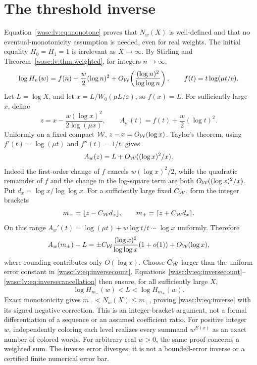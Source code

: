 \documentclass[11pt,a4paper]{article}
\theoremstyle{remark}\newtheorem{remark}[theorem]{Remark}
\numberwithin{equation}{section}
\begin{document}
\section{The threshold inverse}\label{wasc:lv:sec:inverse}
Equation~\eqref{wasc:lv:eq:monotone} proves that $N_w(X)$ is well-defined and that no eventual-monotonicity assumption is needed, even for real weights. The initial equality $H_0=H_1=1$ is irrelevant as $X\to\infty$.
By Stirling and Theorem~\ref{wasc:lv:thm:weighted}, for integers $n\to\infty$,
\begin{equation}\label{wasc:lv:eq:inversecount}
\log H_n(w)=f(n)+\frac w2(\log n)^2+
O_{\mathcal W}\!\left(\frac{(\log n)^2}{\log\log n}\right),\qquad
f(t)=t\log(\mu t/\mathrm e).
\end{equation}
Let $L=\log X$, and let $x=L/W_0(\mu L/\ee)$, so $f(x)=L$.
For sufficiently large $x$, define
\[
z=x-\frac{w(\log x)^2}{2\log(\mu x)},\qquad
A_w(t)=f(t)+\frac w2(\log t)^2.
\]
Uniformly on a fixed compact $\mathcal W$, $z-x=O_{\mathcal W}(\log x)$.
Taylor's theorem, using $f'(t)=\log(\mu t)$ and $f''(t)=1/t$, gives
\begin{equation}\label{wasc:lv:eq:inversecancellation}
A_w(z)=L+O_{\mathcal W}((\log x)^2/x).
\end{equation}
Indeed the first-order change of $f$ cancels $w(\log x)^2/2$, while the quadratic remainder of $f$ and the change in the log-square term are both $O_{\mathcal W}((\log x)^2/x)$.
Put $d_x=\log x/\log\log x$. For a sufficiently large fixed $C_{\mathcal W}$, form the integer brackets
\[
m_- =\lfloor z-C_{\mathcal W}d_x\rfloor,\qquad
m_+ =\lceil z+C_{\mathcal W}d_x\rceil.
\]
On this range $A_w'(t)=\log(\mu t)+w\log t/t\sim\log x$ uniformly. Therefore
\[
A_w(m_\pm)-L=\pm C_{\mathcal W}\frac{(\log x)^2}{\log\log x}(1+o(1))
+O_{\mathcal W}(\log x),
\]
where rounding contributes only $O(\log x)$. Choose $C_{\mathcal W}$ larger than the uniform error constant in \eqref{wasc:lv:eq:inversecount}. Equations~\eqref{wasc:lv:eq:inversecount}--\eqref{wasc:lv:eq:inversecancellation} then ensure, for all sufficiently large $X$,
\[
\log H_{m_-}(w)<L<\log H_{m_+}(w).
\]
Exact monotonicity gives $m_-<N_w(X)\le m_+$, proving \eqref{wasc:lv:eq:inverse} with its signed negative correction. This is an integer-bracket argument, not a formal differentiation of a sequence or an assumed coefficient ratio.
For positive integer $w$, independently coloring each level realizes every summand $w^{E(x)}$ as an exact number of colored words. For arbitrary real $w>0$, the same proof concerns a weighted sum. The inverse error diverges; it is not a bounded-error inverse or a certified finite numerical error bar.
\end{document}
